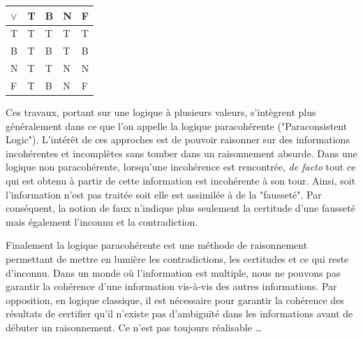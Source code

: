 \begin{refsegment}
\begin{table}[H]
\begin{subtable}{0.35\linewidth}
        \end{subtable}
        \begin{subtable}{0.35\linewidth}
            \centering
            \begin{tabular}{|>{\columncolor{LightCyan}}l|l|l|l|l|}
                \toprule
                \rowcolor{LightCyan}
                $\lor$ & T & B & N & F \\
                \midrule
                T       & T & T & T & T \\ \hline
                B       & T & B & T & B \\ \hline
                N       & T & T & N & N \\ \hline
                F       & T & B & N & F\\
                \bottomrule
            \end{tabular}
        \end{subtable}
    \end{table}

    Ces travaux, portant sur une logique à plusieurs valeurs, s'intègrent plus généralement dans ce que l'on appelle la logique paracohérente ("Paraconsistent Logic"). L'intérêt de ces approches est de pouvoir raisonner sur des informations incohérentes et incomplètes sans tomber dans un raisonnement absurde. Dans une logique non paracohérente, lorsqu'une incohérence est rencontrée, \textit{de facto} tout ce qui est obtenu à partir de cette information est incohérente à son tour. Ainsi, soit l'information n'est pas traitée soit elle est assimilée à de la "fausseté". Par conséquent, la notion de faux n'indique plus seulement la certitude d'une fausseté mais également l'inconnu et la contradiction.
    
    Finalement la logique paracohérente est une méthode de raisonnement permettant de mettre en lumière les contradictions, les certitudes et ce qui reste d'inconnu. Dans un monde où l'information est multiple, nous ne pouvons pas garantir la cohérence d'une information vis-à-vis des autres informations. Par opposition, en logique classique, il est nécessaire pour garantir la cohérence des résultats de certifier qu'il n'existe pas d'ambiguïté dans les informations avant de débuter un raisonnement. Ce n'est pas toujours réalisable \ldots
    

\end{refsegment}
